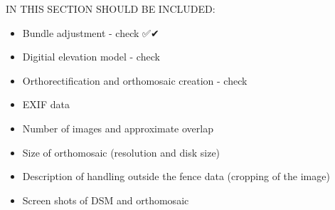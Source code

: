 \documentclass[../Head/Main.tex]{subfiles}
\begin{document}
IN THIS SECTION SHOULD BE INCLUDED:
\begin{itemize}
\item Bundle adjustment - check ✅✔
\item Digitial elevation model - check
\item Orthorectification and orthomosaic creation - check
\item EXIF data
\item Number of images and approximate overlap
\item Size of orthomosaic (resolution and disk size)
\item Description of handling outside the fence data (cropping of the image)
\item Screen shots of DSM and orthomosaic
\end{itemize}
\end{document}
